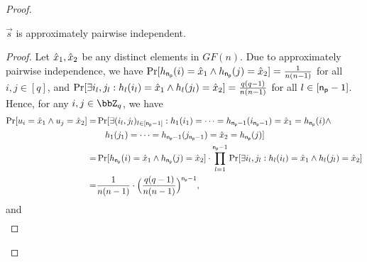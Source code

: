 \begin{proof}
\begin{lemma}
\label{lem:pairwise}
$\vec s$ is approximately pairwise independent. %
\end{lemma}

\begin{proof}
Let $\hat{x}_1,\hat{x}_2$ be any distinct elements in $GF(n)$.
Due to approximately pairwise independence, we have 
$
\Pr[ h_{\mathsf{n_p}}(i)=\hat{x}_1\land  h_{\mathsf{n_p}}(j)=\hat{x}_2]=\frac{1}{n(n-1)}
$
for all $i,j\in[q]$,
and
$
\Pr[\exists i_l,j_l: h_l(i_l)=\hat{x}_1\land h_l(j_l)=\hat{x}_2]=\frac{q(q-1)}{n(n-1)}
$
for all $l\in[\mathsf{n_p}-1]$.
Hence, for any $i,j\in\Z_q$, we have
\[\begin{split}
\Pr[ u_i=\hat{x}_1\land  u_j=\hat{x}_2]
=&\Pr[\exists (i_l,j_l)_{l\in[\mathsf{n_p}-1]}: 
 h_1(i_1)=\cdots= h_{\mathsf{n_p}-1}(i_{\mathsf{n_p}-1})=\hat{x}_1= h_{\mathsf{n_p}}(i)\land\\
 &\hspace*{1em} h_1(j_1)=\cdots= h_{\mathsf{n_p}-1}(j_{\mathsf{n_p}-1})=\hat{x}_2= h_{\mathsf{n_p}}(j)]\\
=&\Pr[ h_{\mathsf{n_p}}(i)=\hat{x}_1\land  h_{\mathsf{n_p}}(j)=\hat{x}_2]\cdot\prod_{l=1}^{\mathsf{n_p}-1}\Pr[\exists i_l,j_l: h_l(i_l)=\hat{x}_1\land  h_l(j_l)=\hat{x}_2]\\
=&\frac{1}{n(n-1)}\cdot \Big(\frac{q(q-1)}{n(n-1)}\Big)^{\mathsf{n_p}-1},
\end{split}\]
and
\[\begin{split}

\end{split}\]
\end{proof}
\end{proof}

